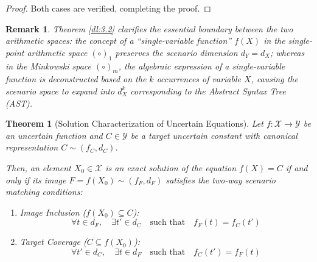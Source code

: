 \documentclass[a4paper,12pt, twoside]{memoir}
\newtheorem{theorem}{Theorem}[chapter]
\newtheorem{remark}{Remark}[chapter]
\begin{document}
\begin{proof}
	Both cases are verified, completing the proof.
\end{proof}
\begin{remark}
	Theorem \ref{dl:3.2} clarifies the essential boundary between the two arithmetic spaces: the concept of a ``single-variable function'' $f(X)$ in the single-point arithmetic space $(\circ)_1$ preserves the scenario dimension $d_Y = d_X$; whereas in the Minkowski space $(\circ)_m$, the algebraic expression of a single-variable function is deconstructed based on the $k$ occurrences of variable $X$, causing the scenario space to expand into $d_X^k$ corresponding to the Abstract Syntax Tree (AST).
\end{remark}

\begin{theorem}[Solution Characterization of Uncertain Equations]
	\label{thm:solution_characterization}
	Let $f : \mathcal{X} \to \mathcal{Y}$ be an uncertain function and $C \in \mathcal{Y}$ be a target uncertain constant with canonical representation $C \sim (f_C, d_C)$.

	Then, an element $X_0 \in \mathcal{X}$ is an exact solution of the equation $f(X) = C$ if and only if its image $F = f(X_0) \sim (f_F, d_F)$ satisfies the two-way scenario matching conditions:
	\begin{enumerate}[leftmargin=*]
		\item Image Inclusion ($f(X_0) \subseteq C$):
		      \[
			      \forall t \in d_F, \quad \exists t' \in d_C \quad \text{such that} \quad f_F(t) = f_C(t')
		      \]
		\item Target Coverage ($C \subseteq f(X_0)$):
		      \[
			      \forall t' \in d_C, \quad \exists t \in d_F \quad \text{such that} \quad f_C(t') = f_F(t)
		      \]
	\end{enumerate}
\end{theorem}
\end{document}
